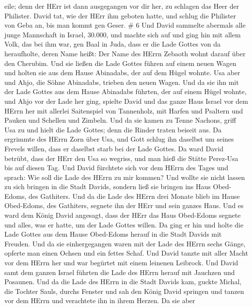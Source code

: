 eile; denn der HErr ist dann ausgegangen vor dir her, zu schlagen das
Heer der Philister.  David tat, wie der HErr ihm geboten
hatte, und schlug die Philister von Geba an, bis man kommt gen Geser. \#
6  Und David sammelte abermals alle junge Mannschaft in
Israel, 30.000,  und machte sich auf und ging hin mit allem
Volk, das bei ihm war, gen Baal in Juda, dass er die Lade Gottes von da
heraufholte, deren Name heißt: Der Name des HErrn Zebaoth wohnt darauf
über den Cherubim.  Und sie ließen die Lade Gottes führen
auf einem neuen Wagen und holten sie aus dem Hause Abinadabs, der auf
dem Hügel wohnte. Usa aber und Ahjo, die Söhne Abinadabs, trieben den
neuen Wagen.  Und da sie ihn mit der Lade Gottes aus dem
Hause Abinadabs führten, der auf einem Hügel wohnte, und Ahjo vor der
Lade her ging,  spielte David und das ganze Haus Israel vor
dem HErrn her mit allerlei Saitenspiel von Tannenholz, mit Harfen und
Psaltern und Pauken und Schellen und Zimbeln.  Und da sie
kamen zu Tenne Nachons, griff Usa zu und hielt die Lade Gottes; denn die
Rinder traten beiseit aus.  Da ergrimmte des HErrn Zorn über
Usa, und Gott schlug ihn daselbst um seines Frevels willen, dass er
daselbst starb bei der Lade Gottes.  Da ward David betrübt,
dass der HErr den Usa so wegriss, und man hieß die Stätte Perez-Usa bis
auf diesen Tag.  Und David fürchtete sich vor dem HErrn des
Tages und sprach: Wie soll die Lade des HErrn zu mir kommen?
 Und wollte sie nicht lassen zu sich bringen in die Stadt
Davids, sondern ließ sie bringen ins Haus Obed-Edoms, des Gathiters.
 Und da die Lade des HErrn drei Monate blieb im Hause
Obed-Edoms, des Gathiters, segnete ihn der HErr und sein ganzes Haus.
 Und es ward dem König David angesagt, dass der HErr das
Haus Obed-Edoms segnete und alles, was er hatte, um der Lade Gottes
willen. Da ging er hin und holte die Lade Gottes aus dem Hause
Obed-Edoms herauf in die Stadt Davids mit Freuden.  Und da
sie einhergegangen waren mit der Lade des HErrn sechs Gänge, opferte man
einen Ochsen und ein fettes Schaf.  Und David tanzte mit
aller Macht vor dem HErrn her und war begürtet mit einem leinenen
Leibrock.  Und David samt dem ganzen Israel führten die
Lade des HErrn herauf mit Jauchzen und Posaunen.  Und da
die Lade des HErrn in die Stadt Davids kam, guckte Michal, die Tochter
Sauls, durchs Fenster und sah den König David springen und tanzen vor
dem HErrn und verachtete ihn in ihrem Herzen.  Da sie aber
